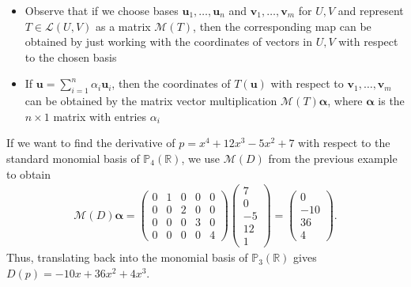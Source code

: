 \documentclass [aspectratio=169]{beamer}
\newcommand{\bu}{{\mathbf{u}}}
\newcommand{\bv}{{\mathbf{v}}}
\newcommand{\R}{{\mathbb{R}}}
\newcommand{\F}{{\mathbb{F}}}
\begin{document}
\begin{frame}
\begin{itemize}
\item Observe that if we choose bases $\bu_1, \ldots, \bu_n$ and $\bv_1, \ldots, \bv_m$ for $U,V$ and represent $T\in \mathcal{L}(U,V)$ as a matrix $\mathcal{M}(T)$, then the corresponding map can be obtained by just working with the coordinates of vectors in $U,V$ with respect to the chosen basis
\item  If $\bu = \sum_{i=1}^n \alpha_i \bu_i$, then the coordinates of $T(\bu)$ with respect to $\bv_1, \ldots, \bv_m$ can be obtained by the matrix vector multiplication $\mathcal{M}(T)\boldsymbol{\alpha}$, where $\boldsymbol{\alpha}$ is the $n\times 1$ matrix with entries $\alpha_i$
\end{itemize}
\end{frame}

\begin{frame}
\begin{example}
If we want to find the derivative of $p= x^4 +12x^3 -5x^2 +7$ with respect to the standard monomial basis of $\mathbb{P}_4(\R)$, we use $\mathcal{M}(D)$ from the previous example to obtain
\begin{align*}
    \mathcal{M}(D)\boldsymbol{\alpha} = \begin{pmatrix}
    0 & 1 & 0 & 0 & 0 \\
    0 & 0 & 2 & 0 & 0 \\
    0 & 0 & 0 & 3 & 0 \\
    0 & 0 & 0 & 0 & 4
     \end{pmatrix} \begin{pmatrix} 7\\ 0\\ -5\\12\\1
     \end{pmatrix} = \begin{pmatrix} 0 \\ -10\\ 36\\4
     \end{pmatrix}.
\end{align*}
Thus, translating back into the monomial basis of $\mathbb{P}_3(\R)$ gives $D(p) = -10x + 36x^2 +4x^3$.
\end{example}

\end{frame}
\end{document}
